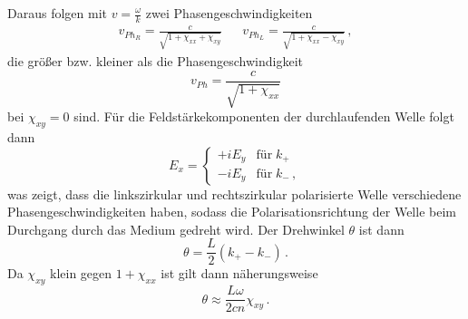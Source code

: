 Daraus folgen mit $v = \frac{\omega}{k}$ zwei Phasengeschwindigkeiten
\begin{align*}
    v_{Ph_R} = \frac{c}{\sqrt{1 + \chi_{xx} + \chi_{xy}}} && v_{Ph_L} = \frac{c}{\sqrt{1 + \chi_{xx} - \chi_{xy}}} \, ,
\end{align*}
die größer bzw. kleiner als die Phasengeschwindigkeit 
\begin{equation*}
    v_{Ph} = \frac{c}{\sqrt{1 + \chi_{xx}}}
\end{equation*}
bei $\chi_{xy} = 0$ sind. Für die Feldstärkekomponenten der durchlaufenden Welle folgt dann
\begin{equation*}
    E_x = \begin{cases}
        + i E_y & \text{für} \; k_{+} \\
        - i E_y & \text{für} \; k_{-} \, ,
    \end{cases}
\end{equation*}
was zeigt, dass die linkszirkular und rechtszirkular polarisierte Welle verschiedene Phasengeschwindigkeiten haben, 
sodass die Polarisationsrichtung der Welle beim Durchgang durch das Medium gedreht wird. Der Drehwinkel $\theta$ ist dann
\begin{equation*}
    \theta = \frac{L}{2} \left(k_{+} - k_{-}\right) \, .
\end{equation*}
Da $\chi_{xy}$ klein gegen $1 + \chi_{xx}$ ist gilt dann näherungsweise
\begin{equation*}
    \theta \approx \frac{L \omega}{2 c n} \chi_{xy} \, .
\end{equation*}
